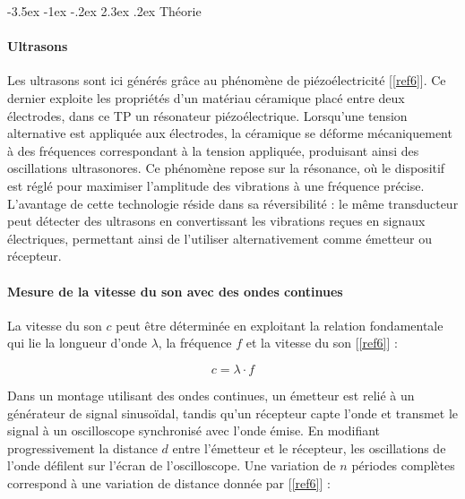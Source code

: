 \documentclass[a4paper, 12pt,oneside]{article}
\makeatletter
\renewcommand{\section}{\@startsection {section}{1}{\z@}%
             {-3.5ex \@plus -1ex \@minus -.2ex}%
             {2.3ex \@plus.2ex}%
             {\normalfont\normalsize\bfseries}}
\makeatother
\begin{document}
\vspace{-0.25cm}
\section{Théorie}
\vspace{-0.25cm}

\paragraph{Ultrasons}

Les ultrasons sont ici générés grâce au phénomène de piézoélectricité [\ref{ref6}]. Ce dernier exploite les propriétés d’un matériau céramique placé entre deux électrodes, dans ce TP un résonateur piézoélectrique. Lorsqu’une tension alternative est appliquée aux électrodes, la céramique se déforme mécaniquement à des fréquences correspondant à la tension appliquée, produisant ainsi des oscillations ultrasonores. Ce phénomène repose sur la résonance, où le dispositif est réglé pour maximiser l’amplitude des vibrations à une fréquence précise. L’avantage de cette technologie réside dans sa réversibilité : le même transducteur peut détecter des ultrasons en convertissant les vibrations reçues en signaux électriques, permettant ainsi de l’utiliser alternativement comme émetteur ou récepteur.

\vspace{-0.25cm}
\paragraph{Mesure de la vitesse du son avec des ondes continues}

La vitesse du son $c$ peut être déterminée en exploitant la relation fondamentale qui lie la longueur d’onde $\lambda$, la fréquence $f$ et la vitesse du son [\ref{ref6}] : 

\vspace{-0.4cm}
\begin{equation}
c = \lambda \cdot f
\label{eq1}
\end{equation}
\vspace{-0.4cm}

Dans un montage utilisant des ondes continues, un émetteur est relié à un générateur de signal sinusoïdal, tandis qu’un récepteur capte l’onde et transmet le signal à un oscilloscope synchronisé avec l’onde émise. En modifiant progressivement la distance $d$ entre l’émetteur et le récepteur, les oscillations de l’onde défilent sur l’écran de l’oscilloscope. Une variation de $n$ périodes complètes correspond à une variation de distance donnée par [\ref{ref6}] :
\end{document}
